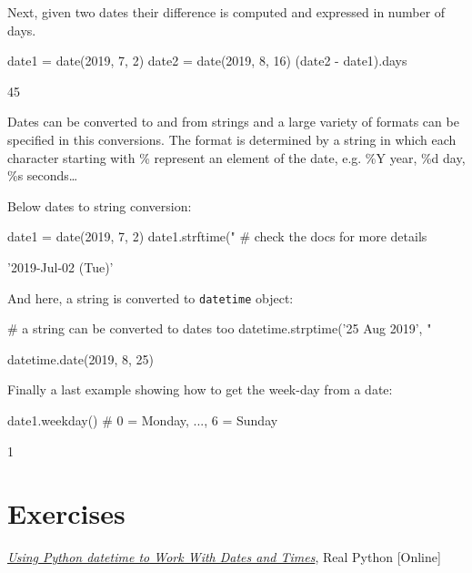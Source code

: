 Next, given two dates their difference is computed and expressed in number of days.

\begin{ipython}
date1 = date(2019, 7, 2)
date2 = date(2019, 8, 16)
(date2 - date1).days
\end{ipython}
\begin{ioutput}
45
\end{ioutput}

Dates can be converted to and from strings and a large variety of formats can be specified in this conversions. 
The format is determined by a string in which each character starting with \% represent an element 
of the date, e.g. \%Y year, \%d day, \%s seconds\ldots

Below dates to string conversion:

\begin{ipython}
date1 = date(2019, 7, 2)
date1.strftime("%
                                # check the docs for more details
\end{ipython}
\begin{ioutput}
'2019-Jul-02 (Tue)'
\end{ioutput}

And here, a string is converted to \texttt{datetime} object:

\begin{ipython}
# a string can be converted to dates too
datetime.strptime('25 Aug 2019', "%
\end{ipython}
\begin{ioutput}
datetime.date(2019, 8, 25)
\end{ioutput}

Finally a last example showing how to get the week-day from a date:

\begin{ipython}
date1.weekday() # 0 = Monday, ..., 6 = Sunday
\end{ipython}
\begin{ioutput}
1
\end{ioutput}

\section{Exercises}


\begin{thebibliography}{9}
 \href{https://realpython.com/python-datetime/}{\emph{Using Python datetime to Work With Dates and Times}}, Real Python [Online]
\end{thebibliography}